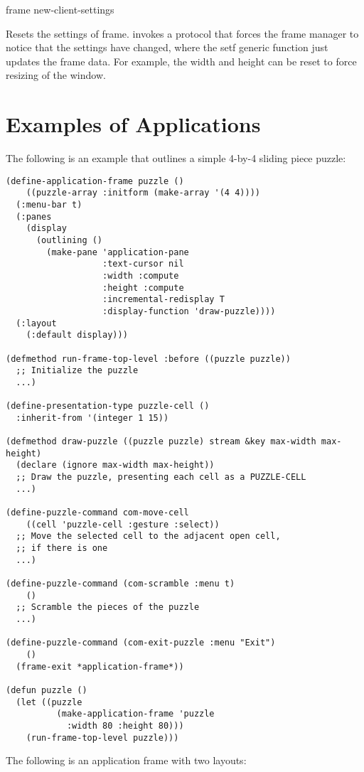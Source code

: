  {frame \rest new-client-settings}

Resets the settings of frame.   invokes a protocol that forces
the frame manager to notice that the settings have changed, where the setf
generic function just updates the frame data.  For example, the width and height
can be reset to force resizing of the window.


\newpage
\section {Examples of Applications}

The following is an example that outlines a simple 4-by-4 sliding piece puzzle:

\begin{verbatim}
(define-application-frame puzzle ()
    ((puzzle-array :initform (make-array '(4 4))))
  (:menu-bar t)
  (:panes
    (display
      (outlining ()
        (make-pane 'application-pane
                   :text-cursor nil
                   :width :compute
                   :height :compute
                   :incremental-redisplay T
                   :display-function 'draw-puzzle))))
  (:layout
    (:default display)))

(defmethod run-frame-top-level :before ((puzzle puzzle))
  ;; Initialize the puzzle
  ...)

(define-presentation-type puzzle-cell ()
  :inherit-from '(integer 1 15))

(defmethod draw-puzzle ((puzzle puzzle) stream &key max-width max-height)
  (declare (ignore max-width max-height))
  ;; Draw the puzzle, presenting each cell as a PUZZLE-CELL
  ...)

(define-puzzle-command com-move-cell
    ((cell 'puzzle-cell :gesture :select))
  ;; Move the selected cell to the adjacent open cell,
  ;; if there is one
  ...)

(define-puzzle-command (com-scramble :menu t)
    ()
  ;; Scramble the pieces of the puzzle
  ...)

(define-puzzle-command (com-exit-puzzle :menu "Exit")
    ()
  (frame-exit *application-frame*))

(defun puzzle ()
  (let ((puzzle 
          (make-application-frame 'puzzle 
            :width 80 :height 80)))
    (run-frame-top-level puzzle)))
\end{verbatim}

The following is an application frame with two layouts:

